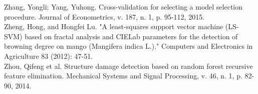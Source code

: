 \noindent Zhang, Yongli; Yang, Yuhong. Cross-validation for selecting a model selection procedure. Journal of Econometrics, v. 187, n. 1, p. 95-112, 2015.
\\

\noindent Zheng, Hong, and Hongfei Lu. "A least-squares support vector machine (LS-SVM) based on fractal analysis and CIELab parameters for the detection of browning degree on mango (Mangifera indica L.)." Computers and Electronics in Agriculture 83 (2012): 47-51.
\\

\noindent Zhou, Qifeng et al. Structure damage detection based on random forest recursive feature elimination. Mechanical Systems and Signal Processing, v. 46, n. 1, p. 82-90, 2014.
\\